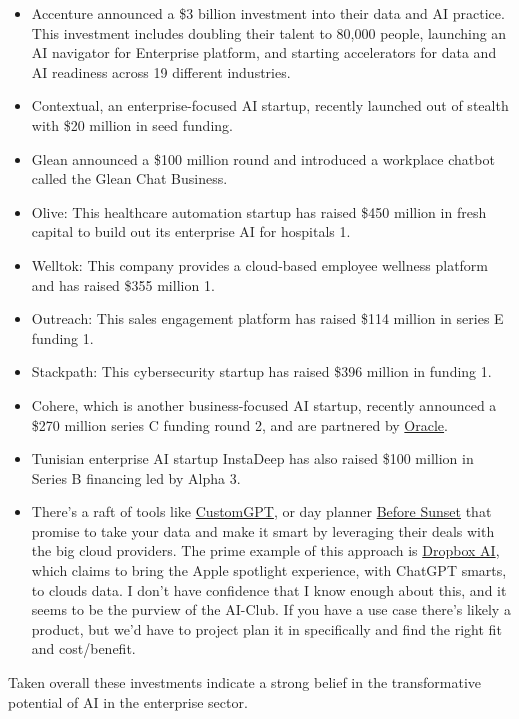 \begin{itemize}
\item Accenture announced a \$3 billion investment into their data and AI practice. This investment includes doubling their talent to 80,000 people, launching an AI navigator for Enterprise platform, and starting accelerators for data and AI readiness across 19 different industries. 
\item Contextual, an enterprise-focused AI startup, recently launched out of stealth with \$20 million in seed funding. 
\item Glean announced a \$100 million round and introduced a workplace chatbot called the Glean Chat Business. 
\item Olive: This healthcare automation startup has raised \$450 million in fresh capital to build out its enterprise AI for hospitals 1.
\item Welltok: This company provides a cloud-based employee wellness platform and has raised \$355 million 1.
\item Outreach: This sales engagement platform has raised \$114 million in series E funding 1.
\item Stackpath: This cybersecurity startup has raised \$396 million in funding 1.
\item Cohere, which is another business-focused AI startup, recently announced a \$270 million series C funding round 2, and are partnered by \href{https://www.oracle.com/news/announcement/oracle-to-deliver-powerful-and-secure-generative-ai-service-for-business-2023-06-13/}{Oracle}.
\item Tunisian enterprise AI startup InstaDeep has also raised \$100 million in Series B financing led by Alpha 3.
\item There's a raft of tools like \href{https://customgpt.ai/}{CustomGPT}, or day planner \href{https://www.beforesunset.ai/}{Before Sunset} that promise to take your data and make it smart by leveraging their deals with the big cloud providers. The prime example of this approach is \href{https://blog.dropbox.com/topics/product/introducing-AI-powered-tools}{Dropbox AI}, which claims to bring the Apple spotlight experience, with ChatGPT smarts, to clouds data. I don't have confidence that I know enough about this, and it seems to be the purview of the AI-Club. If you have a use case there's likely a product, but we'd have to project plan it in specifically and find the right fit and cost/benefit.
\end{itemize}
Taken overall these investments indicate a strong belief in the transformative potential of AI in the enterprise sector.\par

